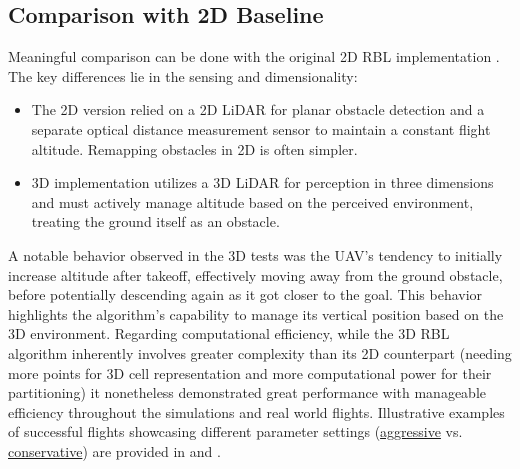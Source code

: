             \subsection{Comparison with 2D Baseline}
                Meaningful comparison can be done with the original 2D RBL implementation \cite{rbl_paper}. 
                The key differences lie in the sensing and dimensionality:
                \begin{itemize}
                    \item The 2D version relied on a 2D \ac{LiDAR} for planar obstacle detection and a separate optical distance measurement sensor to maintain a constant flight altitude. 
                    Remapping obstacles in 2D is often simpler.
                    \item 3D implementation utilizes a 3D \ac{LiDAR} for perception in three dimensions and must actively manage altitude based on the perceived environment, treating the ground itself as an obstacle.
                \end{itemize}
                A notable behavior observed in the 3D tests was the \ac{UAV}'s tendency to initially increase altitude after takeoff, effectively moving away from the ground obstacle, before potentially descending again as it got closer to the goal. 
                This behavior highlights the algorithm's capability to manage its vertical position based on the 3D environment.
                Regarding computational efficiency, while the 3D \ac{RBL} algorithm inherently involves greater complexity than its 2D counterpart (needing more points for 3D cell representation and more computational power for their partitioning) it nonetheless demonstrated great performance with manageable efficiency throughout the simulations and real world flights.
                Illustrative examples of successful flights showcasing different parameter settings (\href{https://www.youtube.com/watch?v=DFt222gnA_w&ab_channel=MichalKamler}{aggressive} vs. \href{https://www.youtube.com/watch?v=AJPk0yVCPUo&ab_channel=MichalKamler}{conservative}) are provided in \cite{aggressive_flight} and \cite{conservative_flight}.

